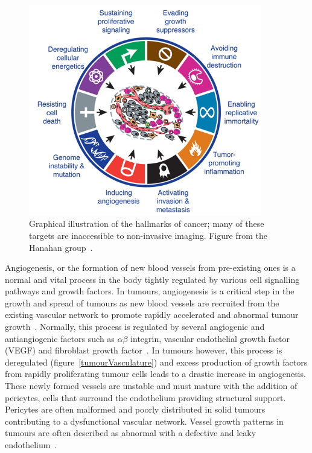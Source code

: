 \begin{figure}[htbp]   
 \begin{center}  
 \includegraphics[width=4in]{intro/./intro-images/cancerHallmarks.png}
 \caption{Graphical illustration of the hallmarks of cancer; many of these targets are inaccessible to non-invasive imaging. Figure from the Hanahan group~\cite{Hanahan:2011gu}.}  
 \label{cancerHallmarks}  
 \end{center}
\end{figure}
Angiogenesis, or the formation of new blood vessels from pre-existing ones is a normal and vital process in the body tightly regulated by various cell signalling pathways and growth factors.
In tumours, angiogenesis is a critical step in the growth and spread of tumours as new blood vessels are recruited from the existing vascular network to promote rapidly accelerated and abnormal tumour growth~\cite{Folkman:1990ud}.
Normally, this process is regulated by several angiogenic and antiangiogenic factors such as $\alpha \beta$ integrin, vascular endothelial growth factor (VEGF) and fibroblast growth factor~\cite{Laking:2006ij}.
In tumours however, this process is deregulated (figure~\ref{tumourVasculature}) and excess production of growth factors from rapidly proliferating tumour cells leads to a drastic increase in angiogenesis.
These newly formed vessels are unstable and must mature with the addition of pericytes, cells that surround the endothelium providing structural support.
Pericytes are often malformed and poorly distributed in solid tumours contributing to a dysfunctional vascular network.
Vessel growth patterns in tumours are often described as abnormal with a defective and leaky endothelium~\cite{McDonald:2002ut}.
